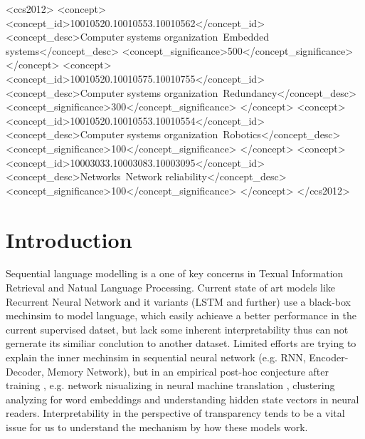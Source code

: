 \documentclass{sig-alternate-05-2015}
\begin{document}
%
%
\begin{CCSXML}
<ccs2012>
 <concept>
  <concept_id>10010520.10010553.10010562</concept_id>
  <concept_desc>Computer systems organization~Embedded systems</concept_desc>
  <concept_significance>500</concept_significance>
 </concept>
 <concept>
  <concept_id>10010520.10010575.10010755</concept_id>
  <concept_desc>Computer systems organization~Redundancy</concept_desc>
  <concept_significance>300</concept_significance>
 </concept>
 <concept>
  <concept_id>10010520.10010553.10010554</concept_id>
  <concept_desc>Computer systems organization~Robotics</concept_desc>
  <concept_significance>100</concept_significance>
 </concept>
 <concept>
  <concept_id>10003033.10003083.10003095</concept_id>
  <concept_desc>Networks~Network reliability</concept_desc>
  <concept_significance>100</concept_significance>
 </concept>
</ccs2012>  
\end{CCSXML}



%
%

%
%
\printccsdesc



\section{Introduction}


Sequential language modelling is a one of key concerns in Texual Information Retrieval and Natual Language Processing. Current state of art models like Recurrent Neural Network and it variants (LSTM and further) use a black-box  mechinsim to model language, which easily achieave  a better performance in the current supervised datset, but lack some inherent interpretability thus can not gernerate its similiar conclution to another dataset. Limited efforts  are trying to explain the inner mechinsim in sequential neural network (e.g. RNN, Encoder-Decoder, Memory Network), but in an empirical post-hoc conjecture after training \cite{lipton2016mythos}, e.g. network nisualizing in neural machine translation \cite{ding2017visualizing},  clustering analyzing for word embeddings \cite{trost2017parameter} and understanding hidden state vectors in neural readers\cite{wang2017emergent}. Interpretability in the perspective of transparency tends to be a vital issue for us to understand the mechanism by how these models work.
\end{document}
